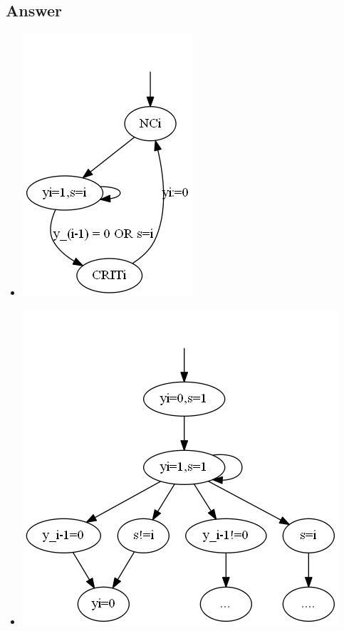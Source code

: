 \documentclass[12pt]{article}
\begin{document}
\subsection*{Answer}
\begin{itemize}
	\item \begin{centering}
		\includegraphics*[scale=0.5]{25a.png}
	\end{centering}
	\item \begin{centering}
		\includegraphics*[scale=0.5]{25b.png}
	\end{centering}

\end{itemize}
\end{document}
